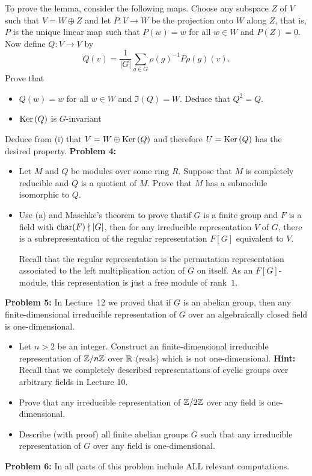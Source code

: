 \documentclass[11pt]{amsart}
\begin{document}
\sk To prove the lemma, consider the following maps. Choose any subspace $Z$ of $V$ such that $V=W\oplus Z$ and
let $P: V\to W$ be the projection onto $W$ along $Z$, that is, $P$ is the unique linear map such that $P(w)=w$ for all $w\in W$ and $P(Z)=0$. Now define $Q:V\to V$ by
$$Q(v)=\frac{1}{|G|}\sum\limits_{g\in G}\rho(g)^{-1} P \rho(g) (v).$$
Prove that 
\begin{itemize}
\item[(i)] $Q(w)=w$ for all $w\in W$ and $\Im(Q)=W$. Deduce that $Q^2=Q$.
\item[(ii)] ${\rm Ker\,}(Q)$ is $G$-invariant
\end{itemize}
Deduce from (i) that $V=W\oplus {\rm Ker\,}(Q)$ and therefore $U={\rm Ker\,}(Q)$ has the desired property.
\skv
{\bf Problem 4:}
\begin{itemize}
\item[(a)] Let $M$ and $Q$ be modules over some ring $R$. Suppose that $M$ is completely reducible and $Q$ is a quotient of $M$.
Prove that $M$ has a submodule isomorphic to $Q$.
\item[(b)] Use (a) and Maschke's theorem to prove thatif $G$ is a finite group and $F$ is a field with ${\rm char}(F)\nmid |G|$,
then for any irreducible representation $V$ of $G$, there is a subrepresentation of the regular representation $F[G]$ equivalent to $V$.

Recall that the regular representation is the permutation representation associated to the left multiplication action of $G$ on itself.
As an $F[G]$-module, this representation is just a free module of rank~$1$.
\end{itemize}
\skv
{\bf Problem 5:} In Lecture~12 we proved that if $G$ is an abelian group, then any finite-dimensional irreducible representation of $G$ over an algebraically closed field is one-dimensional. 
\begin{itemize}
\item[(a)] Let $n>2$ be an integer. Construct an finite-dimensional irreducible representation of ${\mathbb Z}/n{\mathbb Z}$ over ${\mathbb R}$ (reals) which is not one-dimensional. {\bf Hint:} Recall that we completely described representations of cyclic groups over arbitrary fields in Lecture 10.
\item[(b)] Prove that any irreducible representation of ${\mathbb Z}/2{\mathbb Z}$ over any field is one-dimensional.
\item[(c)] Describe (with proof) all finite abelian groups $G$ such that any irreducible representation of $G$ over any field is one-dimensional.
\end{itemize}
{\bf Problem 6:} In all parts of this problem include ALL relevant computations.
\end{document}
